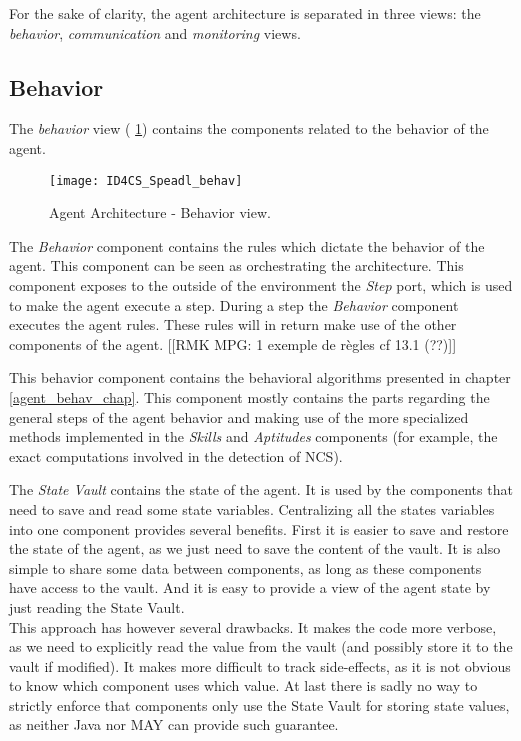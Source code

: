 For the sake of clarity, the agent architecture is separated in three views: the \emph{behavior}, \emph{communication} and \emph{monitoring} views.

\subsection{Behavior}

The \emph{behavior} view (\figurename{} \ref{Arch-behavior}) contains the components related to the behavior of the agent. 

\begin{figure}
\centering
\texttt{[image: ID4CS\_Speadl\_behav]}
\caption{Agent Architecture - Behavior view.}
\label{Arch-behavior}
\end{figure}

The \emph{Behavior} component contains the rules which dictate the behavior of the agent. This component can be seen as orchestrating the architecture. This component exposes to the outside of the environment the \emph{Step} port, which is used to make the agent execute a step. During a step the \emph{Behavior} component executes the agent rules. These rules will in return make use of the other components of the agent. [[RMK MPG: 1 exemple de règles cf 13.1 (??)]]

This behavior component contains the behavioral algorithms presented in chapter \ref{agent_behav_chap}. This component mostly contains the parts regarding the general steps of the agent behavior and making use of the more specialized methods  implemented in the \emph{Skills} and \emph{Aptitudes} components (for example, the exact computations involved in the detection of NCS).

The \emph{State Vault} contains the state of the agent. It is used by the components that need to save and read some state variables. Centralizing all the states variables into one component provides several benefits. First it is easier to save and restore the state of the agent, as we just need to save the content of the vault. It is also simple to share some data between components, as long as these components have access to the vault. And it is easy to provide a view of the agent state by just reading the State Vault.\\
This approach has however several drawbacks. It makes the code more verbose, as we need to explicitly read the value from the vault (and possibly store it to the vault if modified). It makes more difficult to track side-effects, as it is not obvious to know which component uses which value. At last there is sadly no way to strictly enforce that components only use the State Vault for storing state values, as neither Java nor MAY can provide such guarantee.

